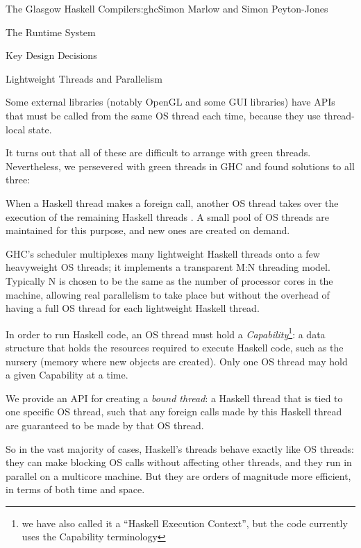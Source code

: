 \begin{aosachapter}{The Glasgow Haskell Compiler}{s:ghc}{Simon Marlow and Simon Peyton-Jones}
\begin{aosasect1}{The Runtime System}
\begin{aosasect2}{Key Design Decisions}
\begin{aosasect3}{Lightweight Threads and Parallelism}
\begin{aosaitemize}
\item Some external libraries (notably OpenGL and some GUI libraries)
  have APIs that must be called from the same OS thread each time,
  because they use thread-local state.

\end{aosaitemize}

It turns out that all of these are difficult to arrange with green
threads.  Nevertheless, we persevered with green threads in GHC and
found solutions to all three:

\begin{aosaitemize}

\item When a Haskell thread makes a foreign call, another OS thread
  takes over the execution of the remaining Haskell threads
  \cite{bib:concffi04}.  A small pool of OS threads are maintained for
  this purpose, and new ones are created on demand.

\item GHC's scheduler multiplexes many lightweight Haskell threads
  onto a few heavyweight OS threads; it implements a transparent M:N
  threading model.  Typically N is chosen to be the same as the number
  of processor cores in the machine, allowing real parallelism to take
  place but without the overhead of having a full OS thread for each
  lightweight Haskell thread.

  In order to run Haskell code, an OS thread must hold a
  \emph{Capability}\footnote{we have also called it a ``Haskell
    Execution Context'', but the code currently uses the Capability
    terminology}: a data structure that holds the resources required
  to execute Haskell code, such as the nursery (memory where new
  objects are created).  Only one OS thread may hold a given
  Capability at a time.

\item We provide an API for creating a \emph{bound thread}: a Haskell
  thread that is tied to one specific OS thread, such that any foreign
  calls made by this Haskell thread are guaranteed to be made by that
  OS thread.

\end{aosaitemize}

So in the vast majority of cases, Haskell's threads behave exactly
like OS threads: they can make blocking OS calls without affecting
other threads, and they run in parallel on a multicore machine.  But
they are orders of magnitude more efficient, in terms of both time and
space.


\end{aosasect3}
\end{aosasect2}
\end{aosasect1}
\end{aosachapter}
